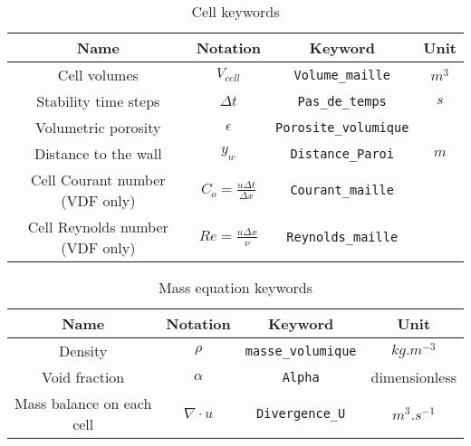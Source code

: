 \begin{table}[!ht]
\begin{center}
\begin{tabular}{c c c c }
\toprule
Name & Notation &  Keyword & Unit \\
\midrule
\rowcolor[gray]{0.9} Cell volumes & $V_{cell}$ & \texttt{Volume_maille} & $m^3$ \\
Stability time steps & $\Delta t$ &  \texttt{Pas_de_temps} & $s$ \\
\rowcolor[gray]{0.9} Volumetric porosity & $\epsilon$  & \texttt{Porosite_volumique} & \\
Distance to the wall & $y_w$ & \texttt{Distance_Paroi} & $m$ \\
\rowcolor[gray]{0.9} Cell Courant number (VDF only) & $C_o=\frac{u\Delta t}{\Delta x}$ & \texttt{Courant_maille}  & \\
Cell Reynolds number (VDF only) & $Re=\frac{u\Delta x}{\nu}$ & \texttt{Reynolds_maille} & \\ \bottomrule
\end{tabular}
\end{center}
\caption{Cell keywords}
\end{table}

\begin{table}[!ht]
\begin{center}
\begin{tabular}{c c c c }
\toprule
Name & Notation & Keyword & Unit \\
\midrule
\rowcolor[gray]{0.9}Density & $\rho$ & \texttt{masse_volumique} & $kg.m^{-3}$ \\
Void fraction & $\alpha$ & \texttt{Alpha} & dimensionless \\
\rowcolor[gray]{0.9} Mass balance on each cell & $\nabla \cdot u$ & \texttt{Divergence_U} & $m^3.s^{-1}$ \\ \bottomrule
\end{tabular}
\end{center}
\caption{Mass equation keywords}
\end{table}


